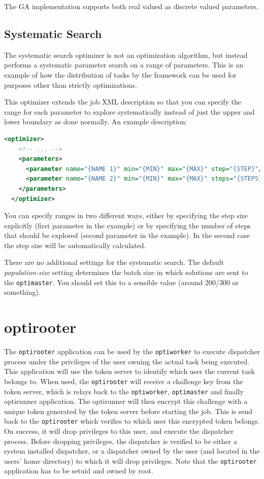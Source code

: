 \documentclass{report}
\begin{document}
The GA implementation supports both real valued as discrete valued parameters.

\subsection{Systematic Search}
The systematic search optimizer is not an optimization algorithm, but instead
performs a systematic parameter search on a range of parameters. This is an
example of how the distribution of tasks by the framework can be used for
purposes other than strictly optimizations.

This optimizer extends the job XML description so that you can specify the
range for each parameter to explore systematically instead of just the upper
and lower boundary as done normally. An example description:

\begin{lstlisting}[language=xml]
  <optimizer>
    <!-- ... -->
    <parameters>
      <parameter name="{NAME 1}" min="{MIN}" max="{MAX}" step="{STEP}"/>
      <parameter name="{NAME 2}" min="{MIN}" max="{MAX}" steps="{STEPS}"/>
    </parameters>
  </optimizer>
\end{lstlisting}

You can specify ranges in two different ways, either by specifying the step
size explicitly (first parameter in the example) or by specifying the number of
steps that should be explored (second parameter in the example). In the second case
the step size will be automatically calculated.

There are no additional settings for the systematic search. The default
\textit{population-size} setting determines the batch size in which
solutions are sent to the \verb!optimaster!. You should set this to a
sensible value (around 200/300 or something).

\section{optirooter}\label{app:optirooter}
The \verb!optirooter! application can be used by the \verb!optiworker! to execute dispatcher
process under the privileges of the user owning the actual task being executed.
This application will use the token server to identify which user the current
task belongs to. When used, the \verb!optirooter! will receive a challenge key from
the token server, which is relays back to the \verb!optiworker!, \verb!optimaster! and
finally optirunner application. The optirunner will then encrypt this challenge
with a unique token generated by the token server before starting the job. This
is send back to the \verb!optirooter! which verifies to which user this encrypted
token belongs. On success, it will drop privileges to this user, and execute
the dispatcher process. Before dropping privileges, the dispatcher is
verified to be either a system installed dispatcher, or a dispatcher owned
by the user (and located in the users' home directory) to which it will
drop privileges. Note that the \verb!optirooter! application has to be setuid and
owned by root.
\end{document}
